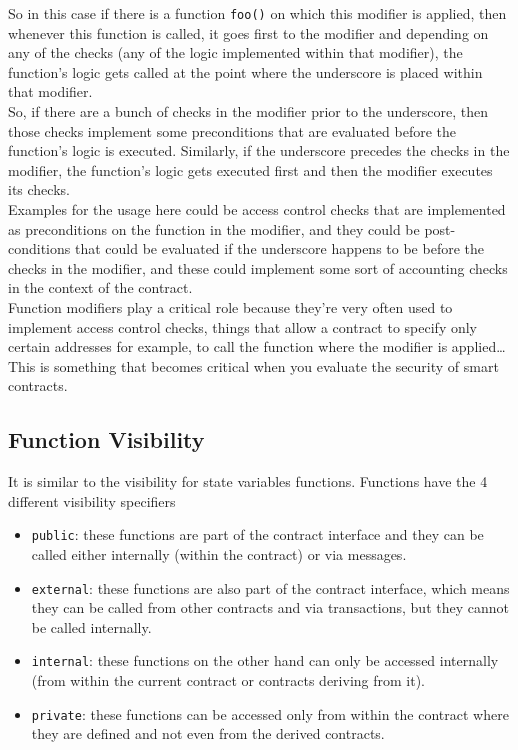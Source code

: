 So in this case if there is a function \texttt{foo()} on which this modifier is applied, then whenever this function is called, it goes first to the modifier and depending on any of the checks (any of the logic implemented within that modifier), the function's logic gets called at the point where the underscore is placed within that modifier.\\

So, if there are a bunch of checks in the modifier prior to the underscore, then those checks implement some preconditions that are evaluated before the function's logic is executed.
Similarly, if the underscore precedes the checks in the modifier, the function's logic gets executed first and then the modifier executes its checks.\\

Examples for the usage here could be access control checks that are implemented as preconditions on the function in the modifier, and they could be post-conditions that could be evaluated if the underscore happens to be before the checks in the modifier, and these could implement some sort of accounting checks in the context of the contract.\\

Function modifiers play a critical role because they're very often used to implement access control checks, things that allow a contract to specify only certain addresses for example, to call the function where the modifier is applied\dots\,
This is something that becomes critical when you evaluate the security of smart contracts.

\subsection*{Function Visibility}
It is similar to the visibility for state variables functions.
Functions have the 4 different visibility specifiers

\begin{itemize}

   \item\texttt{public}: these functions are part of the contract interface and they can be called either internally (within the contract) or via messages.

   \item\texttt{external}: these functions are also part of the contract interface, which means they can be called from other contracts and via transactions, but they cannot be called internally.

   \item\texttt{internal}: these functions on the other hand can only be accessed internally (from within the current contract or contracts deriving from it).

   \item\texttt{private}: these functions can be accessed only from within the contract where they are defined and not even from the derived contracts.

\end{itemize}

